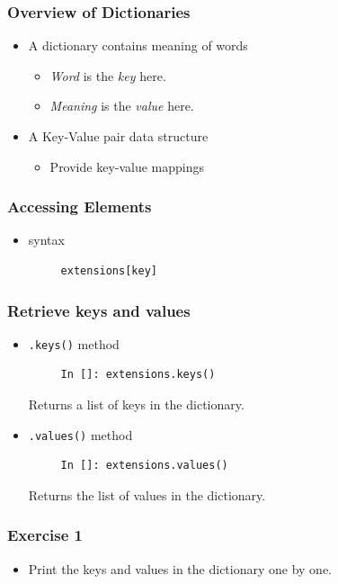 \documentclass[presentation]{beamer}
\begin{document}
\begin{frame}
\frametitle{Overview of Dictionaries}
\label{sec-4}


\begin{itemize}
\item A dictionary contains meaning of words
\begin{itemize}
\item \emph{Word} is the \emph{key} here.
\item \emph{Meaning} is the \emph{value} here.
\end{itemize}
\item A Key-Value pair data structure
\begin{itemize}
\item Provide key-value mappings
\end{itemize}
\end{itemize}
\end{frame}
\begin{frame}[fragile]
\frametitle{Accessing Elements}
\label{sec-5}


\begin{itemize}
\item syntax
\begin{verbatim}
     extensions[key]
\end{verbatim}

\end{itemize}
\end{frame}
\begin{frame}[fragile]
\frametitle{Retrieve keys and values}
\label{sec-6}


\begin{itemize}
\item \verb~.keys()~ method
\begin{verbatim}
     In []: extensions.keys()
\end{verbatim}

    Returns a list of keys in the dictionary.
\item \verb~.values()~ method
\begin{verbatim}
     In []: extensions.values()
\end{verbatim}

    Returns the list of values in the dictionary.
\end{itemize}
\end{frame}
\begin{frame}
\frametitle{Exercise 1}
\label{sec-7}

\begin{itemize}
\item Print the keys and values in the dictionary one by one.
\end{itemize}
\end{frame}
\end{document}
